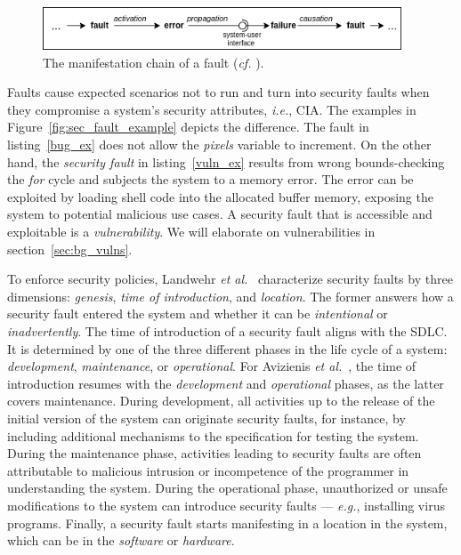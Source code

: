 \begin{figure}[!h]
	\centering
    \includegraphics[width=0.95\textwidth]{figures/chapter_2/fault_pathology.drawio.png}
	\caption{The manifestation chain of a fault (\textit{cf.} \cite{concepts_secure_computing}).}
	\label{fig:fault_chain}
\end{figure}


Faults cause expected scenarios not to run and turn into security faults when they compromise a system's security attributes, \textit{i.e.}, \ac{CIA}. The examples in Figure~\ref{fig:sec_fault_example} depicts the difference. The fault in listing~\ref{bug_ex} does not allow the \textit{pixels} variable to increment. On the other hand, the \textit{security fault} in listing~\ref{vuln_ex} results from wrong bounds-checking the \textit{for} cycle and subjects the system to a memory error. The error can be exploited by loading shell code into the allocated buffer memory, exposing the system to potential malicious use cases. A security fault that is accessible and exploitable is a \textit{vulnerability}. We will elaborate on vulnerabilities in section~\ref{sec:bg_vulns}.
\newline



To enforce security policies, Landwehr \textit{et al.}~\cite{taxonomy_security_flaws} characterize security faults by three dimensions: \textit{genesis}, \textit{time of introduction}, and \textit{location}. The former answers how a security fault entered the system and whether it can be \textit{intentional} or \textit{inadvertently}. The time of introduction of a security fault aligns with the \ac{SDLC}. It is determined by one of the three different phases in the life cycle of a system: \textit{development}, \textit{maintenance}, or \textit{operational}. For Avizienis \textit{et al.}~\cite{concepts_secure_computing}, the time of introduction resumes with the \textit{development} and \textit{operational} phases, as the latter covers maintenance. During development, all activities up to the release of the initial version of the system can originate security faults, for instance, by including additional mechanisms to the specification for testing the system. During the maintenance phase, activities leading to security faults are often attributable to malicious intrusion or incompetence of the programmer in understanding the system. During the operational phase, unauthorized or unsafe modifications to the system can introduce security faults — \textit{e.g.}, installing virus programs. Finally, a security fault starts manifesting in a location in the system, which can be in the \textit{software} or \textit{hardware}.

